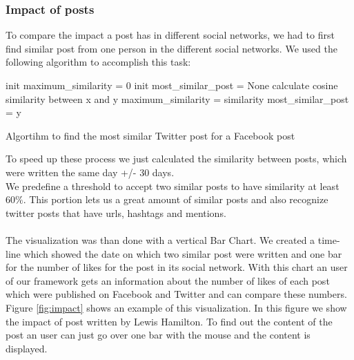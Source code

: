 \subsubsection{Impact of posts}
To compare the impact a post has in different social networks, we had to first find similar post from one person in the different social networks. We used the following algorithm to accomplish this task: \\

\begin{algorithm}
	
	{
		init maximum\_similarity = 0
		init most\_similar\_post = None
		{
			calculate cosine similarity between x and y
			{
				maximum\_similarity = similarity
				most\_similar\_post = y
			}
		}
		
	}				
	\caption{Algortihm to find the most similar Twitter post for a Facebook post}
\end{algorithm}

To speed up these process we just calculated the similarity between posts, which were written the same day +/- 30 days.  \\
We predefine a threshold to accept two similar posts to have similarity at least $60\%$. This portion lets us a great amount of similar posts and also recognize twitter posts that have urls, hashtags and mentions. \\
~\\
The visualization was than done with a vertical Bar Chart. We created a time-line which showed the date on which two similar post were written and one bar for the number of likes for the post in its social network. With this chart an user of our framework gets an information about the number of likes of each post which were published on Facebook and Twitter and can compare these numbers. Figure \ref{fig:impact} shows an example of this visualization. In this figure we show the impact of post written by Lewis Hamilton. To find out the content of the post an user can just go over one bar with the mouse and the content is displayed. 

